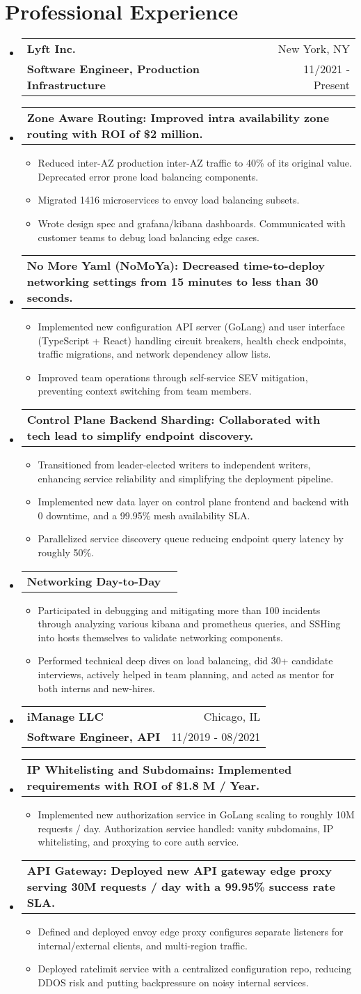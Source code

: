 \documentclass[letterpaper,11pt]{article}
\makeatletter
\newcommand{\cvitem}[1]{
  \item\small{
    {#1\vspace{-2pt}}
  }
}
\newcommand{\cvproject}[2]{
  \vspace{-4pt}\item  %
    \begin{tabular*}{\textwidth}[t]{l@{\extracolsep{\fill}}r}
      \textbf{\small#1} & \small #2 \\
    \end{tabular*}\vspace{-9pt}  %
}
\newcommand{\cvheading}[4]{
  \vspace{-2pt}\item
    \begin{tabular*}{\textwidth}[t]{l@{\extracolsep{\fill}}r}
      \textbf{#1} & #2 \\
      \small#3 & \small #4 \\
    \end{tabular*}\vspace{-9pt}  %
}
\newcommand{\cvheadingstart}{\begin{itemize}[leftmargin=0in, label={}]}
\newcommand{\cvheadingend}{\end{itemize}}
\newcommand{\cvitemstart}{\begin{itemize}\justifying}
\newcommand{\cvitemend}{\end{itemize}\vspace{-5pt}}
\makeatother
\begin{document}
\section{Professional Experience}
\cvheadingstart
  \cvheading
    {Lyft Inc.}{New York, NY}
    {\textbf{Software Engineer, Production Infrastructure}}{11/2021 - Present}
  \cvproject{Zone Aware Routing: Improved intra availability zone routing with ROI of \$2 million.}{}
  \cvitemstart
    \cvitem{Reduced inter-AZ production inter-AZ traffic to 40\% of its original value. Deprecated error prone load balancing components.}
    \cvitem{Migrated 1416 microservices to envoy load balancing subsets.}
    \cvitem{Wrote design spec and grafana/kibana dashboards. Communicated with customer teams to debug load balancing edge cases.}
  \cvitemend
  \cvproject{No More Yaml (NoMoYa): Decreased time-to-deploy networking settings from 15 minutes to less than 30 seconds.}{}
  \cvitemstart
    \cvitem{Implemented new configuration API server (GoLang) and user interface (TypeScript + React) handling circuit breakers, health check endpoints, traffic migrations, and network dependency allow lists.}
    \cvitem{Improved team operations through self-service SEV mitigation, preventing context switching from team members.}
  \cvitemend
  \cvproject{Control Plane Backend Sharding: Collaborated with tech lead to simplify endpoint discovery.}{}
  \cvitemstart
    \cvitem{Transitioned from leader-elected writers to independent writers, enhancing service reliability and simplifying the deployment pipeline.}
    \cvitem{Implemented new data layer on control plane frontend and backend with 0 downtime, and a 99.95\% mesh availability SLA.}
    \cvitem{Parallelized service discovery queue reducing endpoint query latency by roughly 50\%.}
  \cvitemend
  \cvproject{Networking Day-to-Day}{}
  \cvitemstart
    \cvitem{Participated in debugging and mitigating more than 100 incidents through analyzing various kibana and prometheus queries, and SSHing into hosts themselves to validate networking components.}
    \cvitem{Performed technical deep dives on load balancing, did 30+ candidate interviews, actively helped in team planning, and acted as mentor for both interns and new-hires.}
  \cvitemend
  \cvheading
    {iManage LLC}{Chicago, IL}
    {\textbf{Software Engineer, API}}{11/2019 - 08/2021}
  \cvproject{IP Whitelisting and Subdomains: Implemented requirements with ROI of \$1.8 M / Year.}{}
  \cvitemstart
    \cvitem{Implemented new authorization service in GoLang scaling to roughly 10M requests / day. Authorization service handled: vanity subdomains, IP whitelisting, and proxying to core auth service.}
  \cvitemend
  \cvproject{API Gateway: Deployed new API gateway edge proxy serving 30M requests / day with a 99.95\% success rate SLA.}{}
  \cvitemstart
    \cvitem{Defined and deployed envoy edge proxy configures separate listeners for internal/external clients, and multi-region traffic.}
    \cvitem{Deployed ratelimit service with a centralized configuration repo, reducing DDOS risk and putting backpressure on noisy internal services.}
  \cvitemend
\cvheadingend
\end{document}
